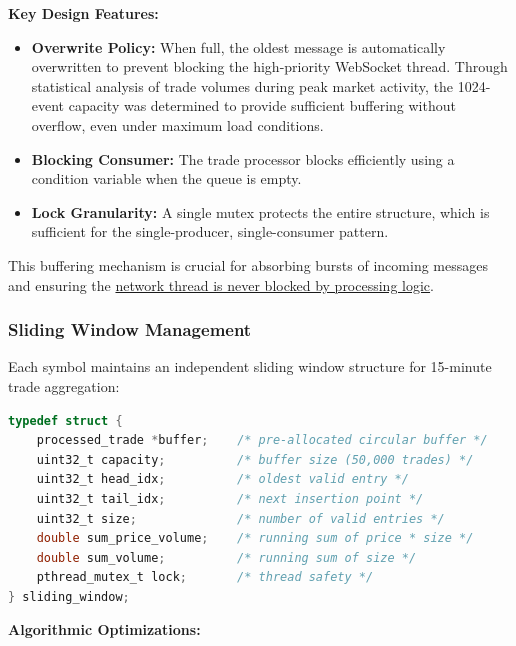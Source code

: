 \documentclass[12pt,a4paper]{article}
\begin{document}
\newpage

\textbf{Key Design Features:}

\begin{itemize}
   
    \item \textbf{Overwrite Policy:} When full, the oldest message is automatically overwritten to prevent blocking the high-priority WebSocket thread. Through statistical analysis of trade volumes during peak market activity, the 1024-event capacity was determined to provide sufficient buffering without overflow, even under maximum load conditions.
    
    \item \textbf{Blocking Consumer:} The trade processor blocks efficiently using a condition variable when the queue is empty.
    
    \item \textbf{Lock Granularity:} A single mutex protects the entire structure, which is sufficient for the single-producer, single-consumer pattern.

\end{itemize}

This buffering mechanism is crucial for absorbing bursts of incoming messages and ensuring the \underline{network thread is never blocked by processing logic}.

\subsubsection{Sliding Window Management}

Each symbol maintains an independent sliding window structure for 15-minute trade aggregation:
\vspace{1mm}
\begin{lstlisting}[language=C, caption=Sliding Window Structure]
typedef struct {
    processed_trade *buffer;    /* pre-allocated circular buffer */
    uint32_t capacity;          /* buffer size (50,000 trades) */
    uint32_t head_idx;          /* oldest valid entry */
    uint32_t tail_idx;          /* next insertion point */
    uint32_t size;              /* number of valid entries */
    double sum_price_volume;    /* running sum of price * size */
    double sum_volume;          /* running sum of size */
    pthread_mutex_t lock;       /* thread safety */
} sliding_window;
\end{lstlisting}

\textbf{Algorithmic Optimizations:}
\end{document}
